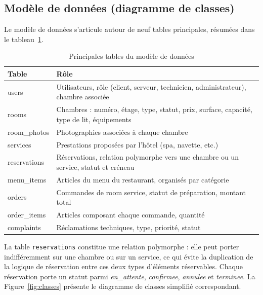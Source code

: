 \documentclass[12pt,a4paper]{report}
\begin{document}
\subsection{Modèle de données (diagramme de classes)}

Le modèle de données s'articule autour de neuf tables principales,
résumées dans le tableau~\ref{tab:tables}.

\begin{table}[H]
\centering
\begin{tabular}{p{3cm} p{9cm}}
\toprule
\textbf{Table} & \textbf{Rôle} \\
\midrule
users & Utilisateurs, rôle (client, serveur, technicien, administrateur),
chambre associée \\
rooms & Chambres : numéro, étage, type, statut, prix, surface, capacité,
type de lit, équipements \\
room\_photos & Photographies associées à chaque chambre \\
services & Prestations proposées par l'hôtel (spa, navette, etc.) \\
reservations & Réservations, relation polymorphe vers une chambre ou un
service, statut et créneau \\
menu\_items & Articles du menu du restaurant, organisés par catégorie \\
orders & Commandes de room service, statut de préparation, montant total \\
order\_items & Articles composant chaque commande, quantité \\
complaints & Réclamations techniques, type, priorité, statut \\
\bottomrule
\end{tabular}
\caption{Principales tables du modèle de données}
\label{tab:tables}
\end{table}

La table \texttt{reservations} constitue une relation polymorphe : elle
peut porter indifféremment sur une chambre ou sur un service, ce qui évite
la duplication de la logique de réservation entre ces deux types
d'éléments réservables. Chaque réservation porte un statut parmi
\emph{en\_attente}, \emph{confirmee}, \emph{annulee} et \emph{terminee}.
La Figure~\ref{fig:classes} présente le diagramme de classes simplifié
correspondant.
\end{document}
